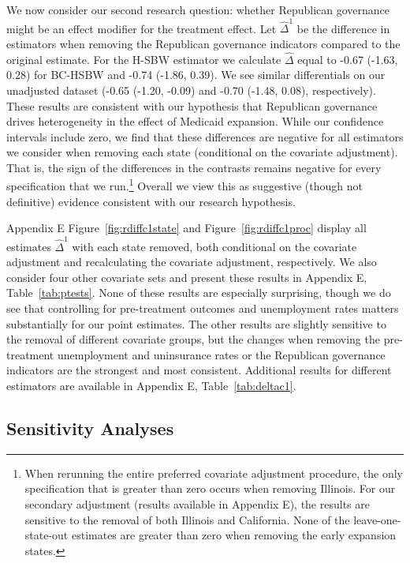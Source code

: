 \documentclass[aoas]{imsart}
\theoremstyle{plain}
\theoremstyle{remark}
\begin{document}
We now consider our second research question: whether Republican governance might be an effect modifier for the treatment effect. Let $\hat{\Delta}^1$ be the difference in estimators when removing the Republican governance indicators compared to the original estimate. For the H-SBW estimator we calculate $\hat{\Delta}$ equal to -0.67 (-1.63, 0.28) for BC-HSBW and -0.74 (-1.86, 0.39). We see similar differentials on our unadjusted dataset (-0.65 (-1.20, -0.09) and -0.70 (-1.48, 0.08), respectively). These results are consistent with our hypothesis that Republican governance drives heterogeneity in the effect of Medicaid expansion. While our confidence intervals include zero, we find that these differences are negative for all estimators we consider when removing each state (conditional on the covariate adjustment). That is, the sign of the differences in the contrasts remains negative for every specification that we run.\footnote{When rerunning the entire preferred covariate adjustment procedure, the only specification that is greater than zero occurs when removing Illinois. For our secondary adjustment (results available in Appendix E), the results are sensitive to the removal of both Illinois and California. None of the leave-one-state-out estimates are greater than zero when removing the early expansion states.} Overall we view this as suggestive (though not definitive) evidence consistent with our research hypothesis.

Appendix E Figure~\ref{fig:rdiffc1state} and Figure~\ref{fig:rdiffc1proc} display all estimates $\hat{\Delta}^1$ with each state removed, both conditional on the covariate adjustment and recalculating the covariate adjustment, respectively. We also consider four other covariate sets and present these results in Appendix E, Table~\ref{tab:ptests}. None of these results are especially surprising, though we do see that controlling for pre-treatment outcomes and unemployment rates matters substantially for our point estimates. The other results are slightly sensitive to the removal of different covariate groups, but the changes when removing the pre-treatment unemployment and uninsurance rates or the Republican governance indicators are the strongest and most consistent. Additional results for different estimators are available in Appendix E, Table~\ref{tab:deltac1}.

\subsection{Sensitivity Analyses} \label{sssec:sensitivity}
\end{document}

